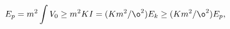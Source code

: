 \begin{equation}\label{omega-inequality}
 E_p = m^2\int V_0 \geq m^2KI = (Km^2/\o^2)E_k \geq (Km^2/\o^2)E_p,
\end{equation}

